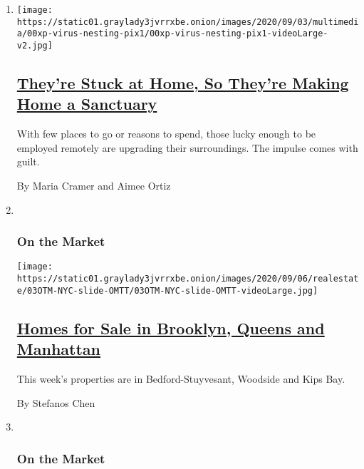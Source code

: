 \begin{enumerate}
\def\labelenumi{\arabic{enumi}.}
\item
  \texttt{[image: https://static01.graylady3jvrrxbe.onion/images/2020/09/03/multimedia/00xp-virus-nesting-pix1/00xp-virus-nesting-pix1-videoLarge-v2.jpg]}

  \hypertarget{theyre-stuck-at-home-so-theyre-making-home-a-sanctuary}{%
  \subsection{\texorpdfstring{\href{/2020/09/04/business/coronavirus-home-upgrades.html}{They're
  Stuck at Home, So They're Making Home a
  Sanctuary}}{They're Stuck at Home, So They're Making Home a Sanctuary}}\label{theyre-stuck-at-home-so-theyre-making-home-a-sanctuary}}

  With few places to go or reasons to spend, those lucky enough to be
  employed remotely are upgrading their surroundings. The impulse comes
  with guilt.

  By Maria Cramer and Aimee Ortiz
\item ~
  \hypertarget{on-the-market}{%
  \subsubsection{On the Market}\label{on-the-market}}

  \texttt{[image: https://static01.graylady3jvrrxbe.onion/images/2020/09/06/realestate/03OTM-NYC-slide-OMTT/03OTM-NYC-slide-OMTT-videoLarge.jpg]}

  \hypertarget{homes-for-sale-in-brooklyn-queens-and-manhattan}{%
  \subsection{\texorpdfstring{\href{/2020/09/03/realestate/homes-for-sale-in-brooklyn-queens-and-manhattan.html}{Homes
  for Sale in Brooklyn, Queens and
  Manhattan}}{Homes for Sale in Brooklyn, Queens and Manhattan}}\label{homes-for-sale-in-brooklyn-queens-and-manhattan}}

  This week's properties are in Bedford-Stuyvesant, Woodside and Kips
  Bay.

  By Stefanos Chen
\item ~
  \hypertarget{on-the-market-1}{%
  \subsubsection{On the Market}\label{on-the-market-1}}


\end{enumerate}
